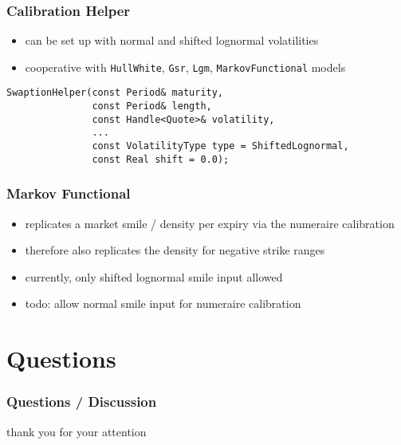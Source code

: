 \documentclass{beamer}
\begin{document}
\begin{frame}[fragile]
\frametitle{Calibration Helper}
\begin{itemize}
\item can be set up with normal and shifted lognormal volatilities
\item cooperative with \verb+HullWhite+, \verb+Gsr+, \verb+Lgm+, \verb+MarkovFunctional+ models
\end{itemize}
\begin{verbatim}
SwaptionHelper(const Period& maturity,
               const Period& length,
               const Handle<Quote>& volatility,
               ...
               const VolatilityType type = ShiftedLognormal,
               const Real shift = 0.0);
\end{verbatim}
\end{frame}

\begin{frame}[fragile]
\frametitle{Markov Functional}
\begin{itemize}
\item replicates a market smile / density per expiry via the numeraire calibration
\item therefore also replicates the density for negative strike ranges
\item currently, only shifted lognormal smile input allowed
\item todo: allow normal smile input for numeraire calibration
\end{itemize}
\end{frame}

\section{Questions}

\begin{frame}[fragile]
\frametitle{Questions / Discussion}
\centerline{thank you for your attention}
\end{frame}
\end{document}
